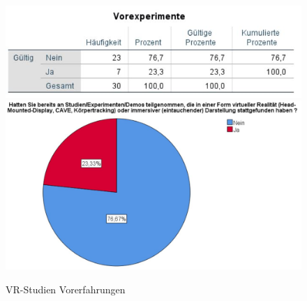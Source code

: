 \documentclass[a4paper,11pt]{article}%
\renewcommand{\\}{\vspace*{0.5\baselineskip} \newline}
\begin{document}
	\begin{figure}[H]
	[scale=0.6]
		\begin{footnotesize}
			\includegraphics[scale=0.6]{Abbildungen/Pre_QuestionnaireStatistiks/teilnehmerVorexperimente}\\
			\includegraphics[scale=0.5]{Abbildungen/Demographie/teilnehmerVorexperimente}\\
			\caption{VR-Studien Vorerfahrungen}
			\label{fig:teilnehmerVorexperimente}
		\end{footnotesize}
	\end{figure}		
	
\end{document}
